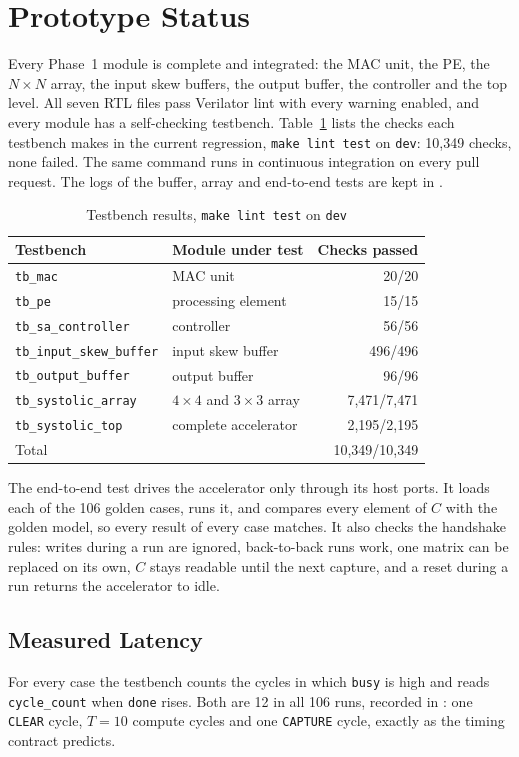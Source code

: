 
\section{Prototype Status}
Every Phase~1 module is complete and integrated: the MAC unit, the PE, the $N \times N$ array, the input skew buffers, the output buffer, the controller and the top level. All seven RTL files pass Verilator lint with every warning enabled, and every module has a self-checking testbench. Table~\ref{tab:tests} lists the checks each testbench makes in the current regression, \texttt{make lint test} on \texttt{dev}: 10{,}349 checks, none failed. The same command runs in continuous integration on every pull request. The logs of the buffer, array and end-to-end tests are kept in .

\begin{table}[t]
\centering
\caption{Testbench results, \texttt{make lint test} on \texttt{dev}}
\label{tab:tests}
\footnotesize
\begin{tabular}{@{}llr@{}}
\toprule
Testbench & Module under test & Checks passed \\
\midrule
\texttt{tb\_mac} & MAC unit & 20/20 \\
\texttt{tb\_pe} & processing element & 15/15 \\
\texttt{tb\_sa\_controller} & controller & 56/56 \\
\texttt{tb\_input\_skew\_buffer} & input skew buffer & 496/496 \\
\texttt{tb\_output\_buffer} & output buffer & 96/96 \\
\texttt{tb\_systolic\_array} & $4 \times 4$ and $3 \times 3$ array & 7{,}471/7{,}471 \\
\texttt{tb\_systolic\_top} & complete accelerator & 2{,}195/2{,}195 \\
\midrule
Total & & 10{,}349/10{,}349 \\
\bottomrule
\end{tabular}
\end{table}

The end-to-end test drives the accelerator only through its host ports. It loads each of the 106 golden cases, runs it, and compares every element of $C$ with the golden model, so every result of every case matches. It also checks the handshake rules: writes during a run are ignored, back-to-back runs work, one matrix can be replaced on its own, $C$ stays readable until the next capture, and a reset during a run returns the accelerator to idle.

\subsection{Measured Latency}
For every case the testbench counts the cycles in which \texttt{busy} is high and reads \texttt{cycle\_count} when \texttt{done} rises. Both are 12 in all 106 runs, recorded in : one \texttt{CLEAR} cycle, $T = 10$ compute cycles and one \texttt{CAPTURE} cycle, exactly as the timing contract predicts.

